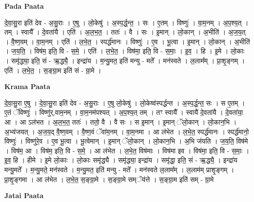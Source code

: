 \documentclass[17pt]{extarticle}
\begin{document}
\textbf{Pada Paata} \newline

दे॒वा॒सु॒रा इति॑ देव - अ॒सु॒राः । ए॒षु । लो॒केषु॑ । अ॒स्प॒र्द्ध॒न्त॒ । सः । ए॒तम् । विष्णुः॑ । वा॒म॒नम् । अ॒प॒श्य॒त् । तम् । स्वायै᳚ । दे॒वता॑यै । एति॑ । अ॒ल॒भ॒त॒ । ततः॑ । वै । सः । इ॒मान् । लो॒कान् । अ॒भीति॑ । अ॒ज॒य॒त् । वै॒ष्ण॒वम् । वा॒म॒नम् । एति॑ । ल॒भे॒त॒ । स्पर्द्ध॑मानः । विष्णुः॑ । ए॒व । भू॒त्वा । इ॒मान् । लो॒कान् । अ॒भीति॑ । ज॒य॒ति॒ । विष॑म॒ इति॒ वि - स॒मे॒ । एति॑ । ल॒भे॒त॒ । विष॑मा॒ इति॒ वि - स॒माः॒ । इ॒व॒ । हि । इ॒मे । लो॒काः । समृ॑द्ध्या॒ इति॒ सं - ऋ॒द्ध्यै॒ । इन्द्रा॑य । म॒न्यु॒मत॒ इति॑ मन्यु - मते᳚ । मन॑स्वते । ल॒लाम᳚म् । प्रा॒शृ॒ङ्गम् । एति॑ । ल॒भे॒त॒ । स॒ङ्ग्रा॒म इति॑ सं - ग्रा॒मे ।  \newline


\textbf{Krama Paata} \newline

दे॒वा॒सु॒रा ए॒षु । दे॒वा॒सु॒रा इति॑ देव - अ॒सु॒राः । ए॒षु लो॒केषु॑ । लो॒केष्व॑स्पर्द्धन्त । अ॒स्प॒र्द्ध॒न्त॒ सः । स ए॒तम् । ए॒तं ॅविष्णुः॑ । विष्णु॑र्,वाम॒नम् । वा॒म॒नम॑पश्यत् । अ॒प॒श्य॒त् तम् । तꣳ स्वायै᳚ । स्वायै॑ दे॒वता॑यै । दे॒वता॑या॒ आ । आ ऽल॑भत । अ॒ल॒भ॒त॒ ततः॑ । ततो॒ वै । वै सः । स इ॒मान् । इ॒मान् ॅलो॒कान् । लो॒कान॒भि । अ॒भ्य॑जयत् । अ॒ज॒य॒द् वै॒ष्ण॒वम् । वै॒ष्ण॒वं ॅवा॑म॒नम् । वा॒म॒नमा । आ ल॑भेत । ल॒भे॒त॒ स्पर्द्ध॑मानः । स्पर्द्ध॑मानो॒ विष्णुः॑ । विष्णु॑रे॒व । ए॒व भू॒त्वा । भू॒त्वेमान् । इ॒मान् ॅलो॒कान् । लो॒कान॒भि । अ॒भि ज॑यति । ज॒य॒ति॒ विष॑मे । विष॑म॒ आ । विष॑म॒ इति॒ वि - स॒मे॒ । आ ल॑भेत । ल॒भे॒त॒ विष॑माः । विष॑मा इव । विष॑मा॒ इति॒ वि - स॒माः॒ । इ॒व॒ हि । हीमे । इ॒मे लो॒काः । लो॒काः समृ॑द्ध्यै । समृ॑द्ध्या॒ इन्द्रा॑य । समृ॑द्धा॒ इति॒ सं - ऋ॒द्ध्यै॒ । इन्द्रा॑य मन्यु॒मते᳚ । म॒न्यु॒मते॒ मन॑स्वते । म॒न्यु॒मत॒ इति॑ मन्यु - मते᳚ । मन॑स्वते ल॒लाम᳚म् । ल॒लाम॑म् प्राशृ॒ङ्गम् । प्रा॒शृ॒ङ्गमा । आ ल॑भेत । ल॒भे॒त॒ स॒ङ्ग्रा॒मे । स॒ङ्ग्रा॒मे सम्ॅय॑त्ते । स॒ङ्ग्रा॒म इति॑ सम् - ग्रा॒मे \newline

\textbf{Jatai Paata} \newline
\end{document}
